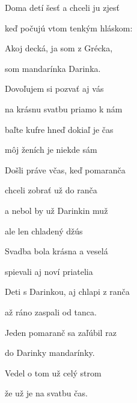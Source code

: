 \begin{song}
\bigskip

Doma detí šesť a chceli ju zjesť\par
keď počujú vtom tenkým hláskom:\par
{}Akoj decká, ja som z Grécka,\par
som mandarínka Darinka.\par

\bigskip

Dovoľujem si pozvať aj vás\par
na krásnu svatbu priamo k nám\par
{}baľte kufre hneď dokiaľ je čas\par
{}môj ženích je niekde sám \par

\bigskip

Došli práve včas, keď pomaranča\par
{}chceli zobrať už do ranča\par
a nebol by už Darinkin muž\par
{}ale len chladený džús\par

\bigskip

Svadba bola krásna a veselá\par
{}spievali aj noví priatelia\par
{}Deti s Darinkou, aj chlapi z ranča\par
až ráno zaspali od tanca. \par

\bigskip

Jeden pomaranč sa zaľúbil raz\par
{}do Darinky mandarínky.\par
{}Vedel o tom už celý strom\par
{}že už je na svatbu čas.\par

\end{song}
